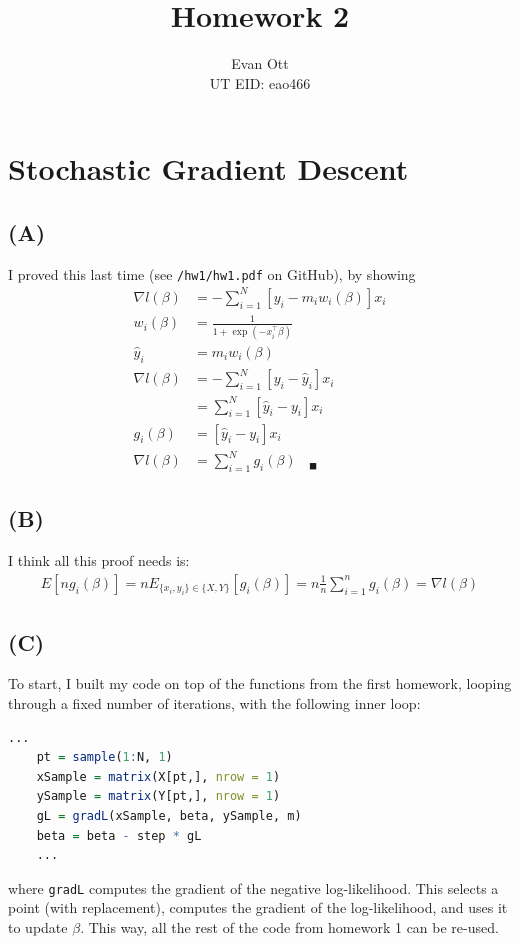 \documentclass{article}
\title{\vspace{-6ex}Homework 2\vspace{-2ex}}
\author{Evan Ott \\ UT EID: eao466\vspace{-2ex}}
\begin{document}
\maketitle

\section{Stochastic Gradient Descent}
\subsection{(A)}
I proved this last time (see \texttt{/hw1/hw1.pdf} on GitHub), by showing
\begin{align*}
\nabla l(\beta)&=-\sum_{i=1}^N\left[y_i-m_i w_i(\beta)\right]x_i\\
w_i(\beta)&=\frac{1}{1+\exp\left(-x_i^\top \beta\right)}\\
\hat{y}_i&=m_i w_i(\beta)\\
\nabla l(\beta)&=-\sum_{i=1}^N\left[y_i-\hat{y}_i\right]x_i\\
&=\sum_{i=1}^N\left[\hat{y}_i-y_i\right]x_i\\
g_i(\beta)&=\left[\hat{y}_i-y_i\right]x_i\\
\nabla l(\beta)&=\sum_{i=1}^N g_i(\beta) ~~~~_\blacksquare
\end{align*}

\subsection{(B)}
I think all this proof needs is:
\begin{align*}
E[ng_i(\beta)] = n E_{\{x_i, y_i\} \in \{X, Y\}}[g_i(\beta)]=n \frac{1}{n}\sum_{i=1}^n g_i(\beta)=\nabla l(\beta)
\end{align*}

\subsection{(C)}
To start, I built my code on top of the functions from the first homework, looping through a fixed number of iterations,
with the following inner loop:
\begin{lstlisting}[language=R]
    ...
    pt = sample(1:N, 1)
    xSample = matrix(X[pt,], nrow = 1)
    ySample = matrix(Y[pt,], nrow = 1)
    gL = gradL(xSample, beta, ySample, m)
    beta = beta - step * gL
    ...
\end{lstlisting}
where \texttt{gradL} computes the gradient of the negative log-likelihood. This selects a point (with replacement),
computes the gradient of the log-likelihood, and uses it to update $\beta$. This way, all the rest of the code from homework 1 can be re-used.
\end{document}
